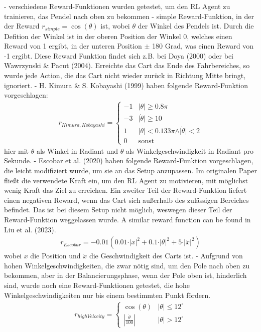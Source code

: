 - verschiedene Reward-Funktionen wurden getestet, um den RL Agent zu trainieren, das Pendel nach oben zu bekommen
- simple Reward-Funktion, in der der Reward $r_{simple}=\cos(\theta)$ ist, wobei $\theta$ der Winkel des Pendels ist. Durch die Defition der Winkel ist in der oberen Position der Winkel 0, welches einen Reward von 1 ergibt, in der unteren Position $\pm$ 180 Grad, was einen Reward von -1 ergibt. Diese Reward Funktion findet sich z.B. bei Doya (2000) oder bei Wawrzynski & Pacut (2004). Erreichte das Cart das Ende des Fahrbereiches, so wurde jede Action, die das Cart nicht wieder zurück in Richtung Mitte bringt, ignoriert.
- H. Kimura & S. Kobayashi (1999) haben folgende Reward-Funktion vorgeschlagen: \begin{align}
    r_{Kimura,Kobayashi} = \begin{cases}
        -1 & \vert\theta\vert \ge 0.8\pi \\
        -3 & \vert\dot{\theta}\vert \ge 10 \\
        1 & \vert\theta\vert < 0.133\pi \land \vert\dot{\theta}\vert < 2 \\ 
        0 & \text{sonst}
    \end{cases}
\end{align} hier mit $\theta$ als Winkel in Radiant und $\dot{\theta}$ als Winkelgeschwindigkeit in Radiant pro Sekunde.
- Escobar et al. (2020) haben folgende Reward-Funktion vorgeschlagen, die leicht modifiziert wurde, um sie an das Setup anzupassen. Im originalen Paper fließt die verwendete Kraft ein, um den RL Agent zu motivieren, mit möglichst wenig Kraft das Ziel zu erreichen. Ein zweiter Teil der Reward-Funktion liefert einen negativen Reward, wenn das Cart sich außerhalb des zulässigen Bereiches befindet. Das ist bei diesem Setup nicht möglich, weswegen dieser Teil der Reward-Funktion weggelassen wurde. A similar reward function can be found in Liu et al. (2023). \begin{align}
    r_{Escobar} = -0.01\left(0.01\cdot\vert x\vert^2 + 0.1\cdot\vert\theta\vert^2 + 5\cdot\vert \dot{x}\vert^2\right)
\end{align} wobei $x$ die Position und $\dot{x}$ die Geschwindigkeit des Carts ist. 
- Aufgrund von hohen Winkelgeschwindigkeiten, die zwar nötig sind, um den Pole nach oben zu bekommen, aber in der Balancierungsphase, wenn der Pole oben ist, hinderlich sind, wurde noch eine Reward-Funktionen getestet, die hohe Winkelgeschwindigkeiten nur bis einem bestimmten Punkt fördern. \begin{align}
    r_{highVelocity} = \begin{cases}
        \cos(\theta) & \vert\theta\vert \le 12^\circ \\
        \left|\frac{\dot{\theta}}{100}\right| & \vert\theta\vert > 12^\circ
    \end{cases}
\end{align}
